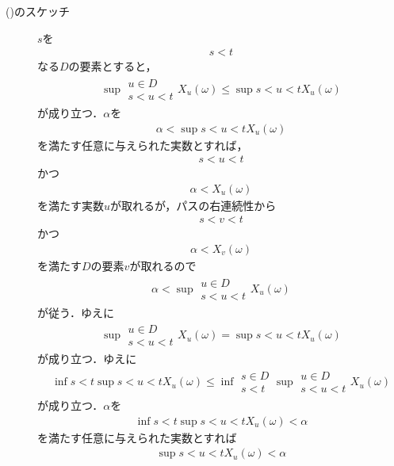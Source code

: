 \begin{sketch}
\begin{description}
			\item[()のスケッチ]
				$s$を
				\begin{align}
					s < t
				\end{align}
				なる$D$の要素とすると，
				\begin{align}
					\sup{\substack{u \in D \\ s < u < t}}{X_u(\omega)} \leq \sup{s < u < t}{X_u(\omega)}
				\end{align}
				が成り立つ．$\alpha$を
				\begin{align}
					\alpha < \sup{s < u < t}{X_u(\omega)}
				\end{align}
				を満たす任意に与えられた実数とすれば，
				\begin{align}
					s < u < t
				\end{align}
				かつ
				\begin{align}
					\alpha < X_u(\omega)
				\end{align}
				を満たす実数$u$が取れるが，パスの右連続性から
				\begin{align}
					s < v < t
				\end{align}
				かつ
				\begin{align}
					\alpha < X_v(\omega)
				\end{align}
				を満たす$D$の要素$v$が取れるので
				\begin{align}
					\alpha < \sup{\substack{u \in D \\ s < u < t}}{X_u(\omega)}
				\end{align}
				が従う．ゆえに
				\begin{align}
					\sup{\substack{u \in D \\ s < u < t}}{X_u(\omega)} = \sup{s < u < t}{X_u(\omega)}
				\end{align}
				が成り立つ．ゆえに
				\begin{align}
					\inf{s < t}{\sup{s < u < t}{X_u(\omega)}} \leq
					\inf{\substack{s \in D \\ s < t}}{\sup{\substack{u \in D \\ s < u < t}}{X_u(\omega)}}
				\end{align}
				が成り立つ．$\alpha$を
				\begin{align}
					\inf{s < t}{\sup{s < u < t}{X_u(\omega)}} < \alpha
				\end{align}
				を満たす任意に与えられた実数とすれば
				\begin{align}
					\sup{s < u < t}{X_u(\omega)} < \alpha
				\end{align}

\end{description}
\end{sketch}
